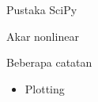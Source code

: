 \begin{frame}{Pustaka SciPy}

Akar nonlinear

\end{frame}



\begin{frame}{Beberapa catatan}
\begin{itemize}
\item Plotting
\end{itemize}
\end{frame}






